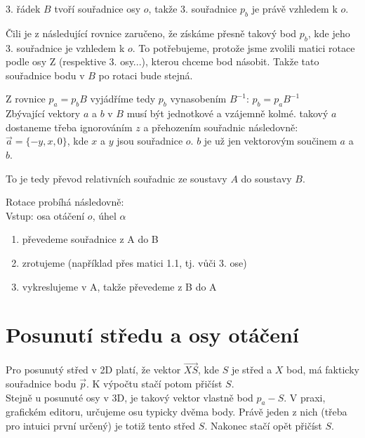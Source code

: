 \documentclass[a4paper,12pt]{book}
\begin{document}
3. řádek $B$ tvoří souřadnice osy $o$, takže 3. souřadnice $p_b$ je právě vzhledem k $o$.

Čili je z následující rovnice zaručeno, že získáme přesně takový bod $p_b$, kde jeho 3. souřadnice je vzhledem k $o$. To potřebujeme, protože jsme zvolili matici
rotace podle osy Z (respektive 3. osy...), kterou chceme bod násobit. Takže tato souřadnice bodu v $B$ po rotaci bude stejná.

Z rovnice $p_a = p_b B$ vyjádříme tedy $p_b$ vynasobením $B^{-1}$: $p_b = p_a B^{-1}$\\ %


Zbývající vektory $a$ a $b$ v $B$ musí být jednotkové a vzájemně kolmé. takový $a$ dostaneme třeba ignorováním $z$ a přehozením souřadnic následovně: $\vec{a} = \{-y, x, 0\}$, kde $x$ a $y$ jsou souřadnice $o$. $b$ je už jen vektorovým součinem $a$ a $b$.

To je tedy převod relativních souřadnic ze soustavy $A$ do soustavy $B$.




Rotace probíhá následovně:\\

Vstup: osa otáčení $o$, úhel $\alpha$

\begin{enumerate}[label=\arabic*, font=\bfseries] %
	\item převedeme souřadnice z A do B
	\item zrotujeme (například přes matici 1.1, tj. vůči 3. ose)
	\item vykreslujeme v A, takže převedeme z B do A
\end{enumerate}

\section{Posunutí středu a osy otáčení}

Pro posunutý střed v 2D platí, že vektor $\vec{XS}$, kde $S$ je střed a $X$ bod, má fakticky souřadnice bodu $\vec{p}$. K výpočtu stačí potom přičíst $S$.\\

Stejně u posunuté osy v 3D, je takový vektor vlastně bod $p_a-S$.
V praxi, grafickém editoru, určujeme osu typicky dvěma body. Právě jeden z nich (třeba pro intuici první určený) je totiž tento střed $S$. Nakonec stačí opět přičíst $S$.
\end{document}
